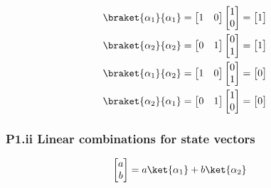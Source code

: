 \begin{align*}
\braket{\alpha_1}{\alpha_1} &= 
\begin{bmatrix}
1 & 0
\end{bmatrix} 
\begin{bmatrix}
1 \\
0
\end{bmatrix} =
\begin{bmatrix}
1
\end{bmatrix} \\
\braket{\alpha_2}{\alpha_2} &= 
\begin{bmatrix}
0 & 1
\end{bmatrix} 
\begin{bmatrix}
0 \\
1
\end{bmatrix} =
\begin{bmatrix}
1
\end{bmatrix} \\
\braket{\alpha_1}{\alpha_2} &= 
\begin{bmatrix}
1 & 0
\end{bmatrix} 
\begin{bmatrix}
0 \\
1
\end{bmatrix} =
\begin{bmatrix}
0
\end{bmatrix} \\
\braket{\alpha_2}{\alpha_1} &= 
\begin{bmatrix}
0 & 1
\end{bmatrix} 
\begin{bmatrix}
1 \\
0
\end{bmatrix} =
\begin{bmatrix}
0
\end{bmatrix} \\
\end{align*}

\subsubsection{P1.ii Linear combinations for state vectors}

\begin{align*}
\begin{bmatrix}
a \\
b
\end{bmatrix} &= 
a \ket{\alpha_1}
+b \ket{\alpha_2}
\end{align*}


